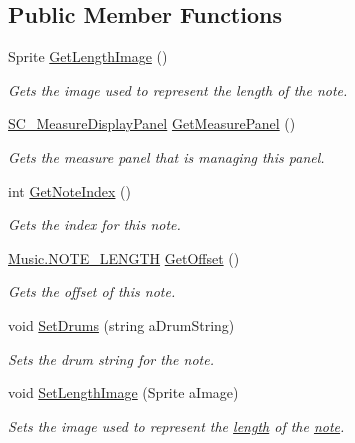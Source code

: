 \subsection*{Public Member Functions}
\begin{DoxyCompactItemize}
\item 
Sprite \hyperlink{group___s_c___n_d_p_unity_ga1038892636ae54a79c675287c4bb6fff}{Get\+Length\+Image} ()
\begin{DoxyCompactList}\small\item\em Gets the image used to represent the length of the note. \end{DoxyCompactList}\item 
\hyperlink{class_s_c___measure_display_panel}{S\+C\+\_\+\+Measure\+Display\+Panel} \hyperlink{group___s_c___n_d_p_unity_ga404972fc48a89d678d0c6fa801573814}{Get\+Measure\+Panel} ()
\begin{DoxyCompactList}\small\item\em Gets the measure panel that is managing this panel. \end{DoxyCompactList}\item 
int \hyperlink{group___s_c___n_d_p_unity_ga8beef050026ade4ba4ccb574c414d24e}{Get\+Note\+Index} ()
\begin{DoxyCompactList}\small\item\em Gets the index for this note. \end{DoxyCompactList}\item 
\hyperlink{group___music_enums_gaf11b5f079adbb21c800b9eca1c5c3cbd}{Music.\+N\+O\+T\+E\+\_\+\+L\+E\+N\+G\+TH} \hyperlink{group___s_c___n_d_p_unity_ga371654221730812200062322c8a3e750}{Get\+Offset} ()
\begin{DoxyCompactList}\small\item\em Gets the offset of this note. \end{DoxyCompactList}\item 
void \hyperlink{group___s_c___n_d_p_unity_gae14b5564be204df7699b95186d83f69f}{Set\+Drums} (string a\+Drum\+String)
\begin{DoxyCompactList}\small\item\em Sets the drum string for the note. \end{DoxyCompactList}\item 
void \hyperlink{group___s_c___n_d_p_unity_ga1a1c4b8111463ec3e134d17fe5064a54}{Set\+Length\+Image} (Sprite a\+Image)
\begin{DoxyCompactList}\small\item\em Sets the image used to represent the \hyperlink{group___music_enums_gaf11b5f079adbb21c800b9eca1c5c3cbd}{length} of the \hyperlink{group___music_structs_struct_music_1_1_combined_note}{note}. \end{DoxyCompactList}\item 

\end{DoxyCompactItemize}
